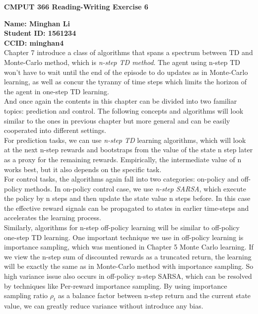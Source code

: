 \documentclass[12pt,a4paper]{article}
\begin{document}
\centerline{\large{\textbf{CMPUT 366 Reading-Writing Exercise 6}}}
\noindent \textbf{Name: Minghan Li}\\
\textbf{Student ID: 1561234}\\
\textbf{CCID: minghan4}\\

Chapter 7 introduce a class of algorithms that spans a spectrum between TD and Monte-Carlo method, which is \textit{n-step TD method}. The agent using n-step TD won't have to wait until the end of the episode to do updates as in Monte-Carlo learning, as well as concur the tyranny of time steps which limits the horizon of the agent in one-step TD learning. \\

And once again the contents in this chapter can be divided into two familiar topics: prediction and control. The following concepts and algorithms will look similar to the ones in previous chapter but more general and can be easily cooperated into different settings.\\

For prediction tasks, we can use \textit{n-step TD} learning algorithms, which will look at the next n-step rewards and bootstraps from the value of the state n step later as a proxy for the remaining rewards. Empirically, the intermediate value of n works best, but it also depends on the specific task.\\

For control tasks, the algorithms again fall into two categories: on-policy and off-policy methods. In on-policy control case, we use \textit{n-step SARSA}, which execute the policy by n steps and then update the state value n steps before. In this case the effective reward signals can be propagated to states 
in earlier time-steps and accelerates the learning process.\\

Similarly, algorithms for n-step off-policy learning will be similar to off-policy one-step TD learning. One important technique we use in off-policy learning is importance sampling, which was mentioned in Chapter 5 Monte Carlo learning. If we view the n-step sum of discounted rewards as a truncated return, the learning will be exactly the same as in Monte-Carlo method with importance sampling. So high variance issue also occurs in off-policy n-step SARSA, which can be resolved by techniques like Per-reward importance sampling. By using importance sampling ratio $\rho_t$ as a balance factor between n-step return and the current state value, we can greatly reduce variance without introduce any bias.\\
\end{document}
